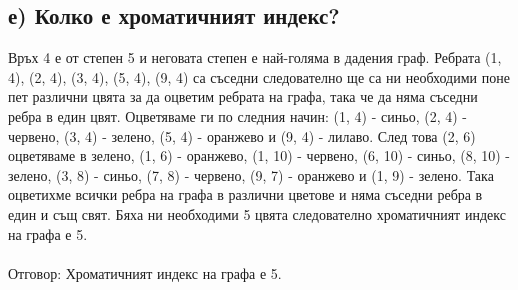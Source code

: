 \documentclass[14pt]{extarticle}
\begin{document}
\subsection*{е) Колко е хроматичният индекс?}
Връх 4 е от степен 5 и неговата степен е най-голяма в дадения граф. Ребрата (1, 4), (2, 4), (3, 4), (5, 4), (9, 4) са съседни следователно ще са ни необходими поне пет различни цвята за да оцветим ребрата на графа, така че да няма съседни ребра в един цвят.
Оцветяваме ги по следния начин: (1, 4) - синьо, (2, 4) - червено, (3, 4) - зелено, (5, 4) - оранжево и (9, 4) - лилаво.
След това (2, 6) оцветяваме в зелено, (1, 6) - оранжево, (1, 10) - червено, (6, 10) - синьо, (8, 10) - зелено, 
(3, 8) - синьо, (7, 8) - червено, (9, 7) - оранжево и (1, 9) - зелено. Така оцветихме всички ребра на графа в различни цветове и няма съседни ребра в един и същ свят. Бяха ни необходими 5 цвята следователно хроматичният индекс на графа е 5.\\\\
Отговор: Хроматичният индекс на графа е 5. \\\\
\end{document}
